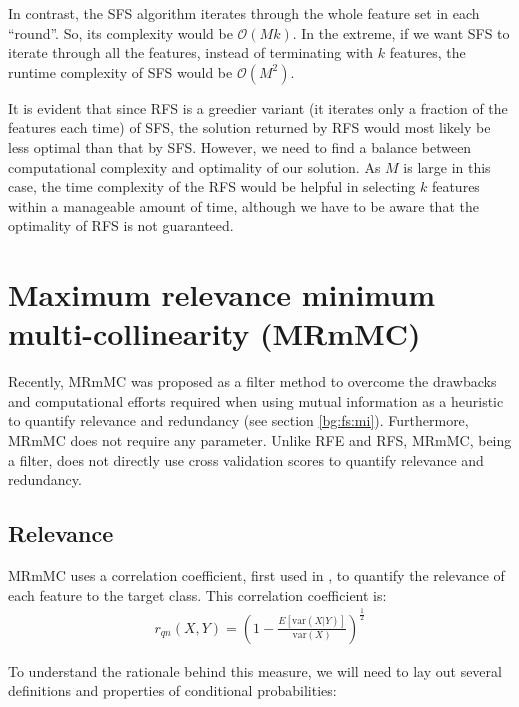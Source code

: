 \documentclass[12pt, twoside, a4paper]{report}
\def\var{\text{var}}
\begin{document}
In contrast, the SFS algorithm iterates through the whole feature set in each ``round''. So, its complexity would be $\mathcal{O}(Mk)$. In the extreme, if we want SFS to iterate through all the features, instead of terminating with $k$ features, the runtime complexity of SFS would be $\mathcal{O}(M^2)$.

It is evident that since RFS is a greedier variant (it iterates only a fraction of the features each time) of SFS, the solution returned by RFS would most likely be less optimal than that by SFS. However, we need to find a balance between computational complexity and optimality of our solution. As $M$ is large in this case, the time complexity of the RFS would be helpful in selecting $k$ features within a manageable amount of time, although we have to be aware that the optimality of RFS is not guaranteed.


\section{Maximum relevance minimum multi-collinearity (MRmMC)} \label{mrmmc}

Recently, MRmMC \cite{RefWorks:187} was proposed as a filter method to overcome the drawbacks and computational efforts required when using mutual information as a heuristic to quantify relevance and redundancy (see section \ref{bg:fs:mi}). Furthermore, MRmMC does not require any parameter. Unlike RFE and RFS, MRmMC, being a filter, does not directly use cross validation scores to quantify relevance and redundancy. 


\subsection{Relevance}

MRmMC uses a correlation coefficient, first used in \cite{RefWorks:188}, to quantify the relevance of each feature to the target class. This correlation coefficient is:
\begin{align} \label{mrmmc:eq:relevance}
r_{qn}(X, Y) = \left( 1 - \frac{E[\var(X|Y)]}{\var(X)} \right)^{\frac{1}{2}}
\end{align}


To understand the rationale behind this measure, we will need to lay out several definitions and properties of conditional probabilities:\\
\end{document}

